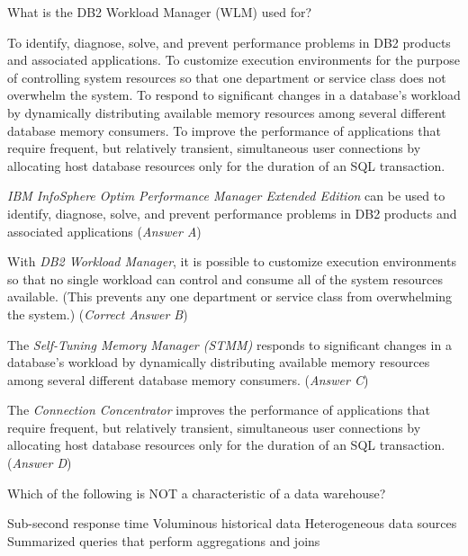 \documentclass[answers, 11pt]{exam}
\begin{document}
\begin{questions}
\question[1]
What is the DB2 Workload Manager (WLM) used for?
\begin{choices}
\choice To identify, diagnose, solve, and prevent performance problems in DB2 products and associated applications.
\CorrectChoice To customize execution environments for the purpose of controlling system resources so that one
		department or service class does not overwhelm the system.
\choice To respond to significant changes in a database's workload by dynamically distributing available memory resources
		among several different database memory consumers.
\choice To improve the performance of applications that require frequent, but relatively transient, simultaneous user
		connections by allocating host database resources only for the duration of an SQL transaction.
\end{choices}

\begin{solution}
\textit{IBM InfoSphere Optim Performance Manager Extended Edition} can be used to 
identify, diagnose, solve, and prevent performance problems in DB2 products and
associated applications (\textit{Answer A})
\par

With \textit{DB2 Workload Manager}, it is possible to customize execution
environments so that no single workload can control and consume all of the system
resources available. (This prevents any one department or service class from
overwhelming the system.) (\textit{Correct Answer B})
\par

The \textit{Self-Tuning Memory Manager (STMM)} responds to significant changes in
a database's workload by dynamically distributing available memory resources among
several different database memory consumers. (\textit{Answer C})
\par

The \textit{Connection Concentrator} improves the performance of applications that
require frequent, but relatively transient, simultaneous user connections by
allocating host database resources only for the duration of an SQL transaction. 
(\textit{Answer D})

\end{solution}


\question[1]
Which of the following is NOT a characteristic of a data warehouse?
\begin{choices}
\CorrectChoice Sub-second response time
\choice Voluminous historical data
\choice Heterogeneous data sources
\choice Summarized queries that perform aggregations and joins
\end{choices}


\end{questions}
\end{document}
